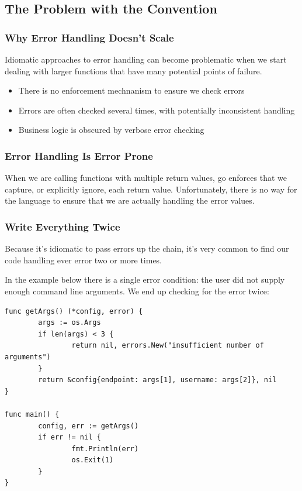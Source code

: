 \documentclass{beamer}
\begin{document}
\subsection{The Problem with the Convention}
\begin{frame}
  \frametitle{Why Error Handling Doesn't Scale}
  Idiomatic approaches to error handling can become problematic when
  we start dealing with larger functions that have many potential
  points of failure.
  \\\vfill
  \begin{itemize}
    \item There is no enforcement mechnanism to ensure we check errors
    \item Errors are often checked several times, with potentially inconsistent handling
    \item Business logic is obscured by verbose error checking
  \end{itemize}
\end{frame}

\begin{frame}
  \frametitle{Error Handling Is Error Prone}
  When we are calling functions with multiple return values, go
  enforces that we capture, or explicitly ignore, each return
  value. Unfortunately, there is no way for the language to ensure
  that we are actually handling the error values.
\end{frame}

\begin{frame}[fragile]
  \frametitle{Write Everything Twice}
  Because it's idiomatic to pass errors up the chain, it's very common
  to find our code handling ever error two or more times.

  In the example below there is a single error condition: the user did
  not supply enough command line arguments. We end up checking for the
  error twice:
  \par\pause
\begin{lstlisting}[language=Golang]
func getArgs() (*config, error) {
        args := os.Args
        if len(args) < 3 {
                return nil, errors.New("insufficient number of arguments")
        }
        return &config{endpoint: args[1], username: args[2]}, nil
}

func main() {
        config, err := getArgs()
        if err != nil {
                fmt.Println(err)
                os.Exit(1)
        }
}
\end{lstlisting}
\end{frame}
\end{document}

